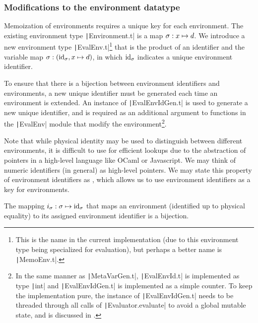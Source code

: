\subsubsection{Modifications to the environment datatype}
\label{sec:memoization-evalenv}

Memoization of environments requires a unique key for each environment. The existing environment type \texttt|Environment.t| is a map $\sigma:x\mapsto d$. We introduce a new environment type \texttt|EvalEnv.t|\footnote{This is the name in the current implementation (due to this environment type being specialized for evaluation), but perhaps a better name is \texttt|MemoEnv.t|.} that is the product of an identifier and the variable map $\sigma:(\text{id}_\sigma,x\mapsto d)$, in which $\text{id}_\sigma$ indicates a unique environment identifier.

To ensure that there is a bijection between environment identifiers and environments, a new unique identifier must be generated each time an environment is extended. An instance of \texttt|EvalEnvIdGen.t| is used to generate a new unique identifier, and is required as an additional argument to functions in the \texttt|EvalEnv| module that modify the environment\footnote{
  In the same manner as \texttt|MetaVarGen.t|, \texttt|EvalEnvId.t| is implemented as type \texttt|int| and \texttt|EvalEnvIdGen.t| is implemented as a simple counter. To keep the implementation pure, the instance of \texttt|EvalEnvIdGen.t| needs to be threaded through all calls of \texttt|Evaluator.evaluate| to avoid a global mutable state, and is discussed in .
}.

Note that while physical identity may be used to distinguish between different environments, it is difficult to use for efficient lookups due to the abstraction of pointers in a high-level language like OCaml or Javascript. We may think of numeric identifiers (in general) as high-level pointers. We may state this property of environment identifiers as , which allows us to use environment identifiers as a key for environments.

\begin{theorem}
  The mapping $i_\sigma:\sigma\mapsto\text{id}_\sigma$ that maps an environment (identified up to physical equality) to its assigned environment identifier is a bijection.
  \label{thm:env-id}
\end{theorem}

